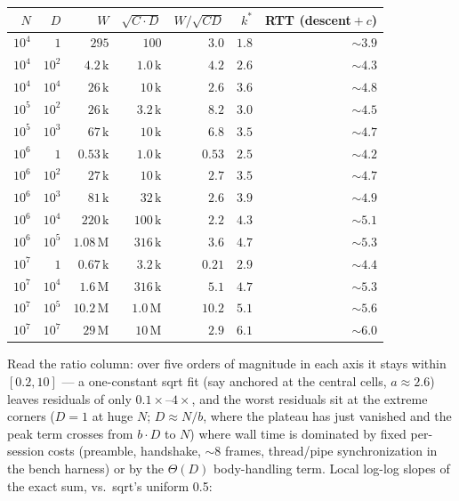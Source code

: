 \documentclass[11pt]{article}
\theoremstyle{plain}
\begin{document}
\begin{center}
\begin{tabular}{@{}rrrrrrr@{}}
\toprule
$N$ & $D$ & $W$ & $\sqrt{C \cdot D}$ & $W/\sqrt{CD}$ & $k^*$ & RTT (descent${}+c$) \\
\midrule
$10^4$ & $1$      & $295$              & $100$              & $3.0$            & $1.8$ & ${\sim}3.9$ \\
$10^4$ & $10^2$   & $4.2\,\mathrm{k}$  & $1.0\,\mathrm{k}$  & $4.2$            & $2.6$ & ${\sim}4.3$ \\
$10^4$ & $10^4$   & $26\,\mathrm{k}$   & $10\,\mathrm{k}$   & $2.6$            & $3.6$ & ${\sim}4.8$ \\
$10^5$ & $10^2$   & $26\,\mathrm{k}$   & $3.2\,\mathrm{k}$  & $\mathbf{8.2}$   & $3.0$ & ${\sim}4.5$ \\
$10^5$ & $10^3$   & $67\,\mathrm{k}$   & $10\,\mathrm{k}$   & $6.8$            & $3.5$ & ${\sim}4.7$ \\
$10^6$ & $1$      & $0.53\,\mathrm{k}$ & $1.0\,\mathrm{k}$  & $\mathbf{0.53}$  & $2.5$ & ${\sim}4.2$ \\
$10^6$ & $10^2$   & $27\,\mathrm{k}$   & $10\,\mathrm{k}$   & $2.7$            & $3.5$ & ${\sim}4.7$ \\
$10^6$ & $10^3$   & $81\,\mathrm{k}$   & $32\,\mathrm{k}$   & $2.6$            & $3.9$ & ${\sim}4.9$ \\
$10^6$ & $10^4$   & $220\,\mathrm{k}$  & $100\,\mathrm{k}$  & $2.2$            & $4.3$ & ${\sim}5.1$ \\
$10^6$ & $10^5$   & $1.08\,\mathrm{M}$ & $316\,\mathrm{k}$  & $3.6$            & $4.7$ & ${\sim}5.3$ \\
$10^7$ & $1$      & $0.67\,\mathrm{k}$ & $3.2\,\mathrm{k}$  & $\mathbf{0.21}$  & $2.9$ & ${\sim}4.4$ \\
$10^7$ & $10^4$   & $1.6\,\mathrm{M}$  & $316\,\mathrm{k}$  & $5.1$            & $4.7$ & ${\sim}5.3$ \\
$10^7$ & $10^5$   & $10.2\,\mathrm{M}$ & $1.0\,\mathrm{M}$  & $\mathbf{10.2}$  & $5.1$ & ${\sim}5.6$ \\
$10^7$ & $10^7$   & $29\,\mathrm{M}$   & $10\,\mathrm{M}$   & $2.9$            & $6.1$ & ${\sim}6.0$ \\
\bottomrule
\end{tabular}
\end{center}

Read the ratio column: over five orders of magnitude in each axis it stays
within $[0.2, 10]$ --- a one-constant sqrt fit (say anchored at the central
cells, $a \approx 2.6$) leaves residuals of only $0.1\times$--$4\times$,
and the worst residuals sit at the extreme corners ($D = 1$ at huge $N$;
$D \approx N/b$, where the plateau has just vanished and the peak term
crosses from $b \cdot D$ to $N$) where wall time is dominated by fixed
per-session costs (preamble, handshake, ${\sim}8$ frames, thread/pipe
synchronization in the bench harness) or by the $\Theta(D)$ body-handling
term. Local log-log slopes of the exact sum, vs.\ sqrt's uniform 0.5:
\end{document}
